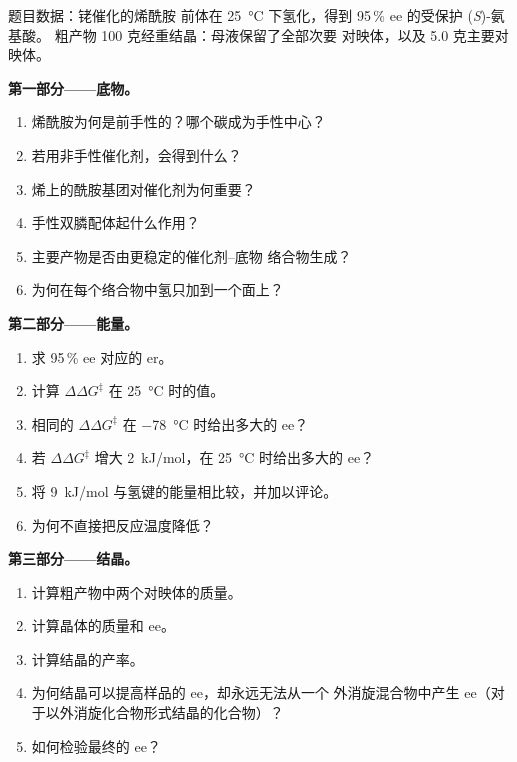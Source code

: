 \begin{problem}
\label{pb:b3:asymmetric-synthesis:1}
题目数据：铑催化的烯酰胺
前体在 \qty{25}{\celsius} 下氢化，得到 95\,\% ee 的受保护 (\textit{S})-氨基酸。
粗产物 100 克经重结晶：母液保留了全部次要
对映体，以及 5.0 克主要对映体。

\medskip\noindent\textbf{第一部分——底物。}
\begin{enumerate}
  \item 烯酰胺为何是前手性的？哪个碳成为手性中心？
  \item 若用非手性催化剂，会得到什么？
  \item 烯上的酰胺基团对催化剂为何重要？
  \item 手性双膦配体起什么作用？
  \item 主要产物是否由更稳定的催化剂–底物
        络合物生成？
  \item 为何在每个络合物中氢只加到一个面上？
\end{enumerate}

\medskip\noindent\textbf{第二部分——能量。}
\begin{enumerate}[resume]
  \item 求 95\,\% ee 对应的 er。
  \item 计算 $\Delta\Delta G^\ddagger$ 在 \qty{25}{\celsius} 时的值。
  \item 相同的 $\Delta\Delta G^\ddagger$ 在 \qty{-78}{\celsius} 时给出多大的 ee？
  \item 若 $\Delta\Delta G^\ddagger$ 增大 \qty{2}{kJ/mol}，在 \qty{25}{\celsius} 时给出多大的 ee？
  \item 将 \qty{9}{kJ/mol} 与氢键的能量相比较，并加以评论。
  \item 为何不直接把反应温度降低？
\end{enumerate}

\medskip\noindent\textbf{第三部分——结晶。}
\begin{enumerate}[resume]
  \item 计算粗产物中两个对映体的质量。
  \item 计算晶体的质量和 ee。
  \item 计算结晶的产率。
  \item 为何结晶可以提高样品的 ee，却永远无法从一个
        外消旋混合物中产生 ee（对于以外消旋化合物形式结晶的化合物）？
  \item 如何检验最终的 ee？
\end{enumerate}


\end{problem}
